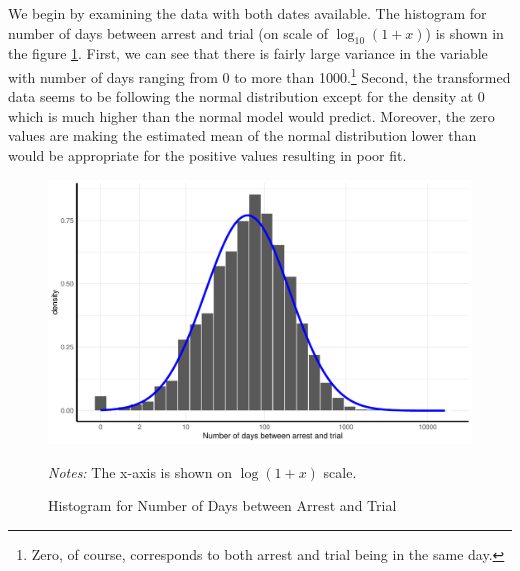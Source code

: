 We begin by examining the data with both dates available. 
The histogram for number of days between arrest and trial (on scale of $\log_{10}(1 + x)$) is shown in the figure \ref{fig:simple_lm_hist}. First, we can see that there is fairly large variance in the variable with   number of days ranging from 0 to more than 1000.\footnote{Zero, of course, corresponds to both arrest and trial being in the same day.}  Second, the transformed data seems to be following the normal distribution except for the density at 0
 which is much higher than the normal model would predict. Moreover, the  zero values are making the estimated mean of the normal distribution lower than would be appropriate for the positive values resulting in poor fit. 

 \begin{figure}[h]
\centering
\caption{Histogram for Number of Days between Arrest and Trial}
\includegraphics[width=\textwidth]{plots/imputing_arrest_date/simple_lm_hist.pdf}
\label{fig:simple_lm_hist}
\begin{minipage}{0.92\textwidth}
\footnotesize
\emph{Notes:} The x-axis is shown on  $\log(1 + x)$ scale.
\end{minipage}

\end{figure}

